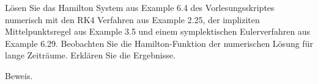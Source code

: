 \begin{exercise}
  Lösen Sie das Hamilton System aus Example 6.4 des Vorlesungsskriptes
  numerisch mit den RK4 Verfahren aus Example 2.25, der impliziten
  Mittelpunktsregel aus Example 3.5 und einem symplektischen
  Eulerverfahren aus Example 6.29. Beobachten Sie die
  Hamilton-Funktion der numerischen Lösung für lange Zeiträume.
  Erklären Sie die Ergebnisse.
\end{exercise}

\begin{solution}
  Beweis.
\end{solution}
